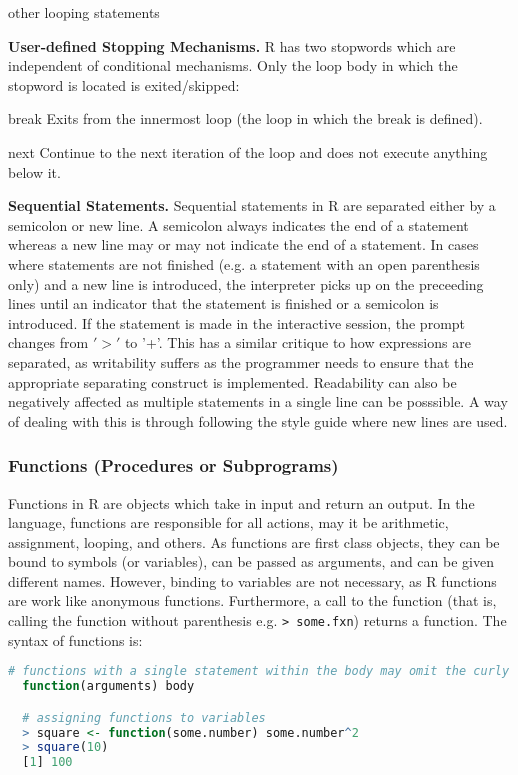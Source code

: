 \documentclass[12pt]{article}
\begin{document}
other looping statements

\textbf{User-defined Stopping Mechanisms.} R has two stopwords which are independent of conditional mechanisms. Only the loop body in which the stopword is located is exited/skipped:

\begin{description}
\item{break} Exits from the innermost loop (the loop in which the break is defined).
\item{next} Continue to the next iteration of the loop and does not execute anything below it.
\end{description}

\textbf{Sequential Statements.} Sequential statements in R are separated either by a semicolon or new line. A semicolon always indicates the end of a statement whereas a new line may or may not indicate the end of a statement. In cases where statements are not finished (e.g. a statement with an open parenthesis only) and a new line is introduced, the interpreter picks up on the preceeding lines until an indicator that the statement is finished or a semicolon is introduced. If the statement is made in the interactive session, the prompt changes from \('>'\) to '+'. This has a similar critique to how expressions are separated, as writability suffers as the programmer needs to ensure that the appropriate separating construct is implemented. Readability can also be negatively affected as multiple statements in a single line can be posssible. A way of dealing with this is through following the style guide where new lines are used.

\subsubsection{Functions (Procedures or Subprograms)}

Functions in R are objects which take in input and return an output. In the language, functions are responsible for all actions, may it be arithmetic, assignment, looping, and others. As functions are first class objects, they can be bound to symbols (or variables), can be passed as arguments, and can be given different names. However, binding to variables are not necessary, as R functions are work like anonymous functions. Furthermore, a call to the function (that is, calling the function without parenthesis e.g. \texttt{> some.fxn}) returns a function.  The syntax of functions is:

\begin{lstlisting}[language=R, frame=none]
  # functions with a single statement within the body may omit the curly braces
  function(arguments) body

  # assigning functions to variables
  > square <- function(some.number) some.number^2
  > square(10)
  [1] 100
\end{lstlisting}
\end{document}
